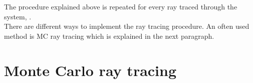 The procedure explained above is repeated for every ray traced through the system, \cite{Gross2005Handbook}. \\ \indent
There are different ways to implement the ray tracing procedure.
An often used method is MC ray tracing which is explained in the next paragraph.


\section{Monte Carlo ray tracing}
%
%


